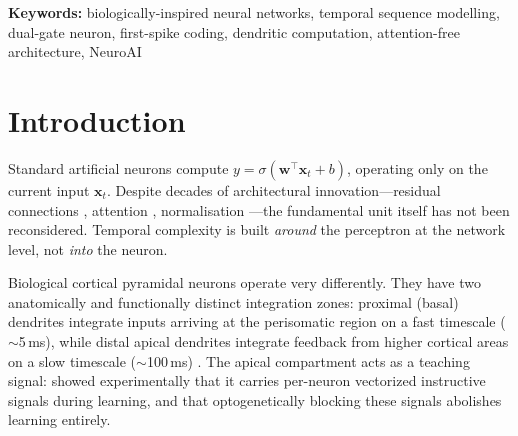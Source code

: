 \documentclass[11pt,a4paper]{article}
\begin{document}
\begin{abstract}
In a preliminary extension (V8-BioMamba), we add neuromodulatory
input-dependent dynamics---inspired by dopaminergic/cholinergic modulation
of dendritic gain---and expand from two to four learned timescales.
In a preliminary evaluation (unmatched parameter counts),
V8-BioMamba outperforms both the Transformer ($-2.6\%$, PPL~5.92 vs~6.21)
and a simplified Mamba baseline ($-0.3\%$) on TinyShakespeare ($T=64$),
while running 3.6$\times$ faster than Mamba via fully parallel
\texttt{conv1d} computation.

Post-training inspection confirms $\alpha_\mathrm{slow} > \alpha_\mathrm{fast}$
in every layer of every experiment without any constraint,
reproducing the biological timescale hierarchy through gradient descent alone.
These results demonstrate that a biologically-grounded temporal neuron
can serve as a viable alternative to attention at the scales tested,
and that the perceptron's temporal blindness is a fundamental
architectural limitation---not merely a training challenge.
\end{abstract}

\noindent\textbf{Keywords:} biologically-inspired neural networks,
temporal sequence modelling, dual-gate neuron, first-spike coding,
dendritic computation, attention-free architecture, NeuroAI

\section{Introduction}

Standard artificial neurons compute
$y = \sigma(\mathbf{w}^\top\mathbf{x}_t + b)$,
operating only on the current input $\mathbf{x}_t$.
Despite decades of architectural innovation---residual connections
\citep{he2016deep}, attention \citep{vaswani2017attention},
normalisation \citep{ba2016layer}---the fundamental unit itself
has not been reconsidered.
Temporal complexity is built \emph{around} the perceptron at the
network level, not \emph{into} the neuron.

Biological cortical pyramidal neurons operate very differently.
They have two anatomically and functionally distinct integration zones:
proximal (basal) dendrites integrate inputs arriving at the perisomatic
region on a fast timescale ($\sim$5\,ms), while distal apical dendrites
integrate feedback from higher cortical areas on a slow timescale
($\sim$100\,ms)
\citep{larkum2013cellular, losonczy2006integrative}.
The apical compartment acts as a teaching signal:
\citet{francioni2026vectorized} showed experimentally that it carries
per-neuron vectorized instructive signals during learning,
and that optogenetically blocking these signals abolishes learning entirely.
\end{document}
